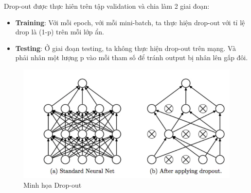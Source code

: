 Drop-out được thực hiên trên tập validation và chia làm 2 giai đoạn:
\begin{itemize}
	\item \textbf{Training}: Với mỗi epoch, với mỗi mini-batch, ta thực hiện drop-out với tỉ lệ drop là (1-p) trên mỗi lớp ẩn.
	\item \textbf{Testing}: Ở giai đoạn testing, ta không thực hiện drop-out trên mạng. Và phải nhân một lượng p vào mỗi tham số để tránh output bị nhân lên gấp đôi.
\end{itemize}
\begin{figure}[H]
	\begin{center}
		\includegraphics[scale=0.5]{images/theo5/drop-out}
		\caption{Minh họa Drop-out}
	\end{center}
\end{figure}
\pagebreak
